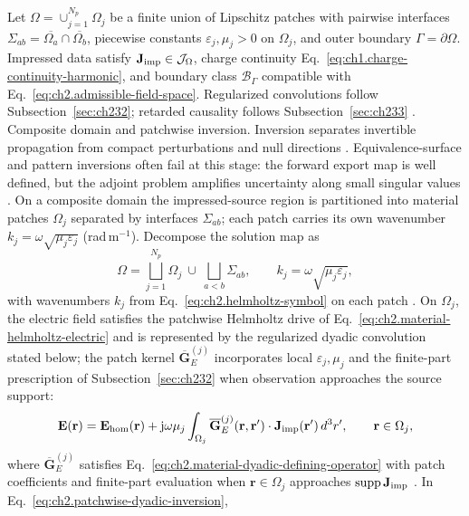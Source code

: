 Let \(\Omega=\cup_{j=1}^{N_p}\Omega_j\) be a finite union of Lipschitz patches with
pairwise interfaces \(\Sigma_{ab}=\overline{\Omega_a}\cap\overline{\Omega_b}\),
piecewise constants \(\varepsilon_j,\mu_j>0\) on \(\Omega_j\), and outer boundary
\(\Gamma=\partial\Omega\). Impressed data satisfy
\(\mathbf{J}_{\mathrm{imp}}\in\mathcal{J}_\Omega\), charge continuity
Eq.~\eqref{eq:ch1.charge-continuity-harmonic}, and boundary class
\(\mathcal{B}_\Gamma\) compatible with Eq.~\eqref{eq:ch2.admissible-field-space}.
Regularized convolutions follow Subsection~\ref{sec:ch232}; retarded causality follows
Subsection~\ref{sec:ch233} \cite{stratton1941}.
Composite domain and patchwise inversion. Inversion separates invertible propagation from
compact perturbations and null directions \cite{stratton1941}. Equivalence-surface and
pattern inversions often fail at this stage: the forward export map is well defined, but the
adjoint problem amplifies uncertainty along small singular values \cite{hansen1988}.
On a composite domain the impressed-source region is partitioned into material patches
\(\Omega_j\) separated by interfaces \(\Sigma_{ab}\); each patch carries its own wavenumber
\(k_j=\omega\sqrt{\mu_j\varepsilon_j}\) (rad\,m\(^{-1}\)).
Decompose the solution map as
\begin{equation}
\label{eq:ch2.composite-domain-decomposition}
\Omega
=
\bigsqcup_{j=1}^{N_p}\Omega_j
\ \cup\
\bigsqcup_{a<b}\Sigma_{ab},
\qquad
k_j=\omega\sqrt{\mu_j\varepsilon_j},
\end{equation}
with wavenumbers \(k_j\) from Eq.~\eqref{eq:ch2.helmholtz-symbol} on each patch
\cite{stratton1941}. On \(\Omega_j\), the electric field satisfies the patchwise
Helmholtz drive of Eq.~\eqref{eq:ch2.material-helmholtz-electric} and is represented
by the regularized dyadic convolution stated below; the patch kernel
\(\overline{\mathbf{G}}_{E}^{(j)}\) incorporates local \(\varepsilon_j,\mu_j\) and the
finite-part prescription of Subsection~\ref{sec:ch232} when observation approaches the
source support:
\begin{equation}
\label{eq:ch2.patchwise-dyadic-inversion}
\mathbf{E}(\mathbf{r})
=
\mathbf{E}_{\mathrm{hom}}(\mathbf{r})
+\mathrm{j}\omega\mu_j
\int_{\Omega_j}
\overline{\mathbf{G}}_{E}^{(j)}(\mathbf{r},\mathbf{r}')\cdot\mathbf{J}_{\mathrm{imp}}(\mathbf{r}')\,d^{3}r',
\qquad
\mathbf{r}\in\Omega_j,
\end{equation}
where \(\overline{\mathbf{G}}_{E}^{(j)}\) satisfies
Eq.~\eqref{eq:ch2.material-dyadic-defining-operator} with patch coefficients and
finite-part evaluation when \(\mathbf{r}\in\Omega_j\) approaches
\(\operatorname{supp}\mathbf{J}_{\mathrm{imp}}\) \cite{harrington2001}. In Eq.~\eqref{eq:ch2.patchwise-dyadic-inversion},
